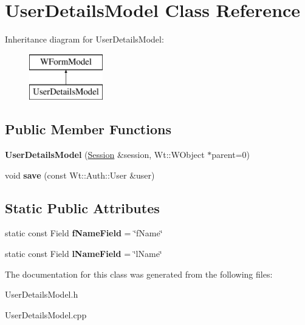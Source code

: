 \hypertarget{class_user_details_model}{}\section{User\+Details\+Model Class Reference}
\label{class_user_details_model}
Inheritance diagram for User\+Details\+Model\+:\begin{figure}[H]
\begin{center}
\leavevmode
\includegraphics[height=2.000000cm]{class_user_details_model}
\end{center}
\end{figure}
\subsection*{Public Member Functions}
\begin{DoxyCompactItemize}
\item 
\mbox{\label{class_user_details_model_aac16af78a18e4a99a6666d85914af5d5}} 
{\bfseries User\+Details\+Model} (\hyperlink{class_session}{Session} \&session, Wt\+::\+W\+Object $\ast$parent=0)
\item 
\mbox{\label{class_user_details_model_a0216d9fc37c8528a5fd49756529d4f57}} 
void {\bfseries save} (const Wt\+::\+Auth\+::\+User \&user)
\end{DoxyCompactItemize}
\subsection*{Static Public Attributes}
\begin{DoxyCompactItemize}
\item 
\mbox{\label{class_user_details_model_a0dca416943dc93ce8e1471b7aaeb93ba}} 
static const Field {\bfseries f\+Name\+Field} = \char`\"{}f\+Name\char`\"{}
\item 
\mbox{\label{class_user_details_model_af0643d8f4b662e2d05ea142835a15a19}} 
static const Field {\bfseries l\+Name\+Field} = \char`\"{}l\+Name\char`\"{}
\end{DoxyCompactItemize}


The documentation for this class was generated from the following files\+:\begin{DoxyCompactItemize}
\item 
User\+Details\+Model.\+h\item 
User\+Details\+Model.\+cpp\end{DoxyCompactItemize}
